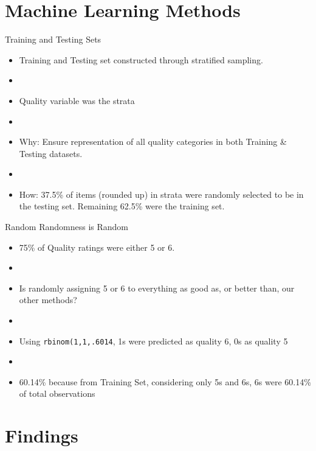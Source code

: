 \documentclass{beamer}
\begin{document}
\section{Machine Learning Methods}
\begin{frame}{Training and Testing Sets}
	\begin{itemize}
	\item Training and Testing set constructed through stratified sampling.
	\item[]
	\item Quality variable was the strata
	\item[]
	\item Why: Ensure representation of all quality categories in both Training \& Testing datasets.
	\item[]
	\item How: 37.5\% of items (rounded up) in strata were randomly selected to be in the testing set. Remaining 62.5\% were the training set.
	\end{itemize}
\end{frame}


\begin{frame}{Random Randomness is Random}
	\begin{itemize}
	\item 75\% of Quality ratings were either 5 or 6. 
	\item[]
	\item Is randomly assigning 5 or 6 to everything as good as, or better than, our other methods?
	\item[]
	\item Using \texttt{rbinom(1,1,.6014}, 1s were predicted as quality 6, 0s as quality 5
	\item[]
	\item 60.14\% because from Training Set, considering only 5s and 6s, 6s were 60.14\% of total observations
	\end{itemize}
\end{frame}


\section{Findings}
\end{document}
